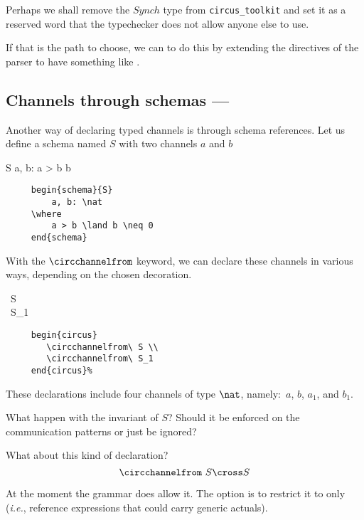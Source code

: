\documentclass{article}
\begin{document}
%
\begin{issue}
    Perhaps we shall remove the $Synch$ type from \texttt{circus\_toolkit} and
    set it as a reserved word that the typechecker does not allow anyone else to
    use.

    If that is the path to choose, we can to do this by extending the
    directives of the parser to have something like .
\end{issue}

\subsection{Channels through schemas --- }

Another way of declaring typed channels is through schema references. Let us
define a schema named $S$ with two channels $a$ and $b$
%
\begin{schema}{S}
   a, b: \nat
\where
   a > b \land b 
\end{schema}
%
\begin{verbatim}
     begin{schema}{S}
         a, b: \nat
     \where
         a > b \land b \neq 0
     end{schema}
\end{verbatim}
%
With the $\circchannelfrom$ keyword, we can declare these channels in various
ways, depending on the chosen decoration.
%
\begin{circus}
   \circchannelfrom\ S \\
   \circchannelfrom\ S_1
\end{circus}%
%
\begin{verbatim}
     begin{circus}
        \circchannelfrom\ S \\
        \circchannelfrom\ S_1
     end{circus}%
\end{verbatim}
%
These declarations include four channels of type $\nat$, namely:~$a$, $b$,
$a_1$, and $b_1$.

%
\begin{issue}
  What happen with the invariant of $S$?
  Should it be enforced on the communication patterns or just be ignored?
\end{issue}

%
\begin{issue}
What about this kind of declaration?
%
\[
   \circchannelfrom\ S \cross S
\]

At the moment the grammar does allow it. The option is to restrict it to
 only (\textit{i.e.}, reference expressions that could carry
generic actuals).
\end{issue}
\end{document}
